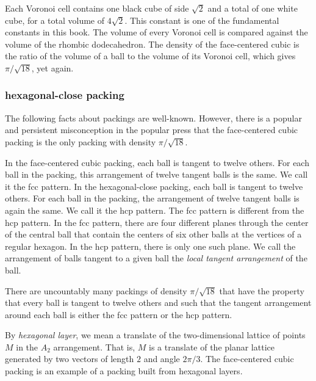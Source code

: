 Each Voronoi cell contains one black cube of side $\sqrt2$ and a total
of one white cube, for a total volume of $4\sqrt2$.  This constant is one of the
fundamental constants in this book.  The volume of every Voronoi cell
is compared against the volume of the rhombic dodecahedron.
The density of the face-centered
cubic is the ratio of the volume of a ball to the volume of its Voronoi
cell, which gives $\pi/\sqrt{18}$, yet again.





\subsubsection{hexagonal-close packing}

The following facts about packings are well-known.  However, there
is a popular and persistent misconception in the popular press
that the face-centered cubic packing is the only packing with
density $\pi/\sqrt{18}$. 

In the face-centered cubic packing, each ball is tangent to twelve
others.  For each ball in the packing, this arrangement of twelve
tangent balls is the same.  We call it the fcc pattern. 
In the
hexagonal-close packing, each ball is tangent to twelve others.
For each ball in the packing, the arrangement of twelve tangent
balls is again the same.  We call it the hcp pattern.  The fcc
pattern is different from the hcp pattern.  In the fcc pattern,
there are four different planes through the center of the central
ball that contain the centers of six other balls at the vertices
of a regular hexagon.  In the hcp pattern, there is only one such
plane.  We call the arrangement of balls tangent to a given ball
the {\it local tangent arrangement} of the ball.

There are uncountably many packings of density $\pi/\sqrt{18}$
that have the property that every ball is tangent to twelve others
and such that the tangent arrangement around each ball is either
the fcc pattern or the hcp pattern.

By {\it hexagonal layer}, we mean a translate of the two-dimensional
lattice of points $M$ in the $A_2$ arrangement. That is, $M$ is a
translate of the planar lattice generated by two vectors of length
$2$ and angle $2\pi/3$.  The face-centered cubic packing is an
example of a packing built from hexagonal layers.

